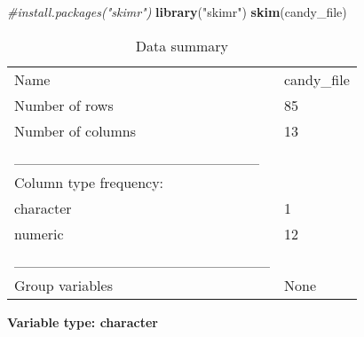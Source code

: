 \documentclass[
]{article}
\newenvironment{Shaded}{\begin{snugshade}}{\end{snugshade}}
\newcommand{\CommentTok}[1]{\textcolor[rgb]{0.56,0.35,0.01}{\textit{#1}}}
\newcommand{\FunctionTok}[1]{\textcolor[rgb]{0.13,0.29,0.53}{\textbf{#1}}}
\newcommand{\NormalTok}[1]{#1}
\newcommand{\StringTok}[1]{\textcolor[rgb]{0.31,0.60,0.02}{#1}}
\begin{document}
\begin{Shaded}
\begin{Highlighting}[]
\CommentTok{\#install.packages("skimr")}
\FunctionTok{library}\NormalTok{(}\StringTok{"skimr"}\NormalTok{)}
\FunctionTok{skim}\NormalTok{(candy\_file)}
\end{Highlighting}
\end{Shaded}

\begin{longtable}[]{@{}ll@{}}
\caption{Data summary}\tabularnewline
\toprule\noalign{}
\endfirsthead
\endhead
\bottomrule\noalign{}
\endlastfoot
Name & candy\_file \\
Number of rows & 85 \\
Number of columns & 13 \\
\_\_\_\_\_\_\_\_\_\_\_\_\_\_\_\_\_\_\_\_\_\_\_ & \\
Column type frequency: & \\
character & 1 \\
numeric & 12 \\
\_\_\_\_\_\_\_\_\_\_\_\_\_\_\_\_\_\_\_\_\_\_\_\_ & \\
Group variables & None \\
\end{longtable}

\textbf{Variable type: character}
\end{document}
